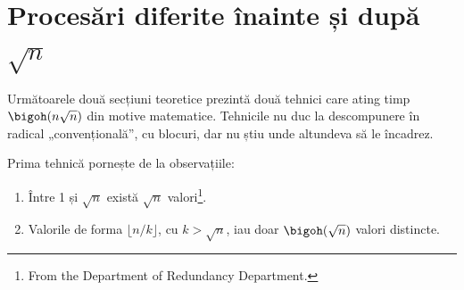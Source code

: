 \section{Procesări diferite înainte și după \texorpdfstring{$\sqrt{n}$}{sqrt(n)}}
\label{sec:sqrt-split}

Următoarele două secțiuni teoretice prezintă două tehnici care ating timp $\bigoh(n \sqrt{n})$ din motive matematice. Tehnicile nu duc la descompunere în radical „convențională”, cu blocuri, dar nu știu unde altundeva să le încadrez.

Prima tehnică pornește de la observațiile:

\begin{enumerate}
  \item Între 1 și $\sqrt{n}$ există $\sqrt{n}$ valori\footnote{From the Department of Redundancy Department.}.
  \item Valorile de forma $\lfloor n / k \rfloor$, cu $k > \sqrt{n}$, iau doar $\bigoh(\sqrt{n})$ valori distincte.
\end{enumerate}
